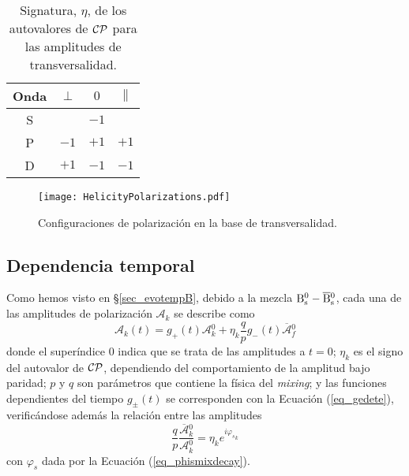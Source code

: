\begin{table}[H]
\centering
\begin{tabular}{c|ccc} 
\toprule
Onda & $\perp$ & $0$ & $\parallel$\\ 
\midrule
S &      & $-1$ &       \\
P & $-1$ & $+1$ & $+1$  \\
D & $+1$ & $-1$ & $-1$  \\ 
\bottomrule
\end{tabular}
\caption{Signatura, $\eta$, de los autovalores de $\mathcal{CP}$ para las amplitudes de transversalidad.}	
\end{table}

\begin{figure}[H]
\centering
\texttt{[image: HelicityPolarizations.pdf]}
\caption{Configuraciones de polarización en la base de transversalidad.}
\end{figure}


\subsection{Dependencia temporal} %
\label{sec_tempdist}

Como hemos visto en \S \ref{sec_evotempB}, debido a la mezcla $\text{B}{}_{\text{s}}^{0}-\overline{\text{B}}{}_{\text{s}}^{0}$, cada una de las amplitudes de polarización $\mathcal{A}_k$ se describe como
\begin{equation}
\mathcal{A}_k(t) = g_+ (t) \mathcal{A}{}_k^0 + \eta_k \frac{q}{p} g_{-}(t) \overline{\mathcal{A}}{}_f^0
\end{equation}
donde el superíndice $0$ indica que se trata de las amplitudes a $t=0$; $\eta_k$ es el signo del autovalor de $\mathcal{CP}$, dependiendo del comportamiento de la amplitud bajo paridad; $p$ y $q$ son parámetros que contiene la física del \emph{mixing}; y las funciones dependientes del tiempo $g_{\pm}(t)$ se corresponden con la Ecuación (\ref{eq_gedete}), verificándose además la relación entre las amplitudes 
\begin{equation}
	\frac{q}{p} \frac{\overline{\mathcal{A}}{}_k^0}{\mathcal{A}{}_k^0} = \eta_k e^{i {\varphi_s}_k}
\end{equation}
con $\varphi_s$ dada por la Ecuación (\ref{eq_phismixdecay}).


